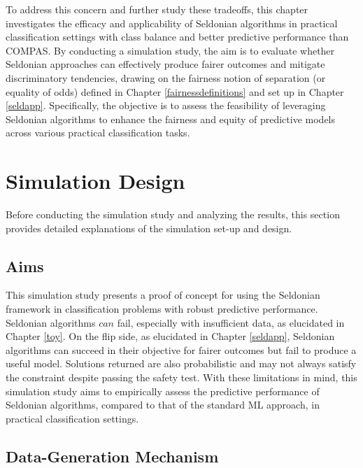 \documentclass[12pt, twoside]{amherstthesis}
\begin{document}
To address this concern and further study these tradeoffs, this chapter investigates the efficacy and applicability of Seldonian algorithms in practical classification settings with class balance and better predictive performance than COMPAS. By conducting a simulation study, the aim is to evaluate whether Seldonian approaches can effectively produce fairer outcomes and mitigate discriminatory tendencies, drawing on the fairness notion of separation (or equality of odds) defined in Chapter \ref{fairnessdefinitions} and set up in Chapter \ref{seldapp}. Specifically, the objective is to assess the feasibility of leveraging Seldonian algorithms to enhance the fairness and equity of predictive models across various practical classification tasks.

\hypertarget{sim-design}{%
\section{Simulation Design}\label{sim-design}}

Before conducting the simulation study and analyzing the results, this section provides detailed explanations of the simulation set-up and design.

\hypertarget{aims}{%
\subsection{Aims}\label{aims}}

This simulation study presents a proof of concept for using the Seldonian framework in classification problems with robust predictive performance. Seldonian algorithms \(\textit{can}\) fail, especially with insufficient data, as elucidated in Chapter \ref{toy}. On the flip side, as elucidated in Chapter \ref{seldapp}, Seldonian algorithms can succeed in their objective for fairer outcomes but fail to produce a useful model. Solutions returned are also probabilistic and may not always satisfy the constraint despite passing the safety test. With these limitations in mind, this simulation study aims to empirically assess the predictive performance of Seldonian algorithms, compared to that of the standard ML approach, in practical classification settings.

\hypertarget{data-gen}{%
\subsection{Data-Generation Mechanism}\label{data-gen}}
\end{document}
